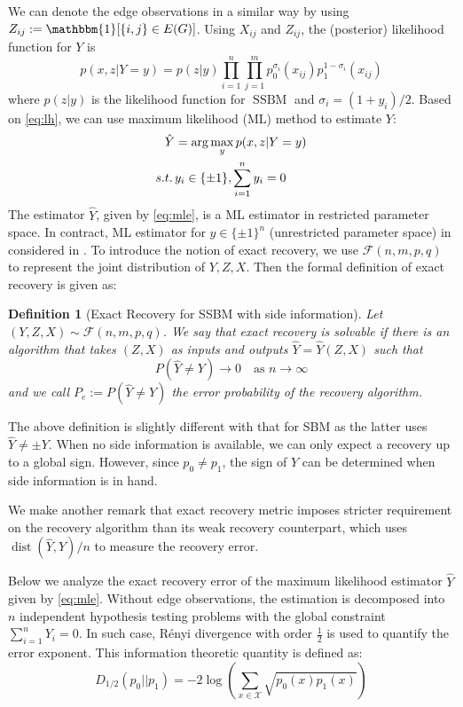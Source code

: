 \documentclass[conference]{IEEEtran}
\newtheorem{definition}{Definition}
\DeclareMathOperator{\SSBM}{SSBM}
\DeclareMathOperator{\dist}{dist}
\begin{document}
We can denote the edge observations in a similar way by using $Z_{ij}:=\mathbbm{1}[\{i,j\} \in E(G)]$.
Using $X_{ij}$ and $Z_{ij}$, the (posterior) likelihood function for $Y$ is
\begin{equation}\label{eq:lh}
    p(x, z| Y=y) = p(z|y)\prod_{i=1}^n \prod_{j=1}^m p^{\sigma_i}_0(x_{ij})p^{1-\sigma_i}_1(x_{ij}) 
\end{equation}
where $p(z|y)$ is the likelihood function for $\SSBM$ and $\sigma_i = (1+y_i)/2$.
Based on \eqref{eq:lh}, we can use maximum likelihood (ML) method to estimate
$Y$:
\begin{align}
    \hat{Y} &= \arg\max_y p(x,z|Y=y) \notag \\
    s.t.\, & y_i \in \{\pm 1\}, \sum_{i=1}^n y_i=0 \label{eq:mle}
\end{align}
The estimator $\hat{Y}$, given by \eqref{eq:mle}, is a ML estimator in restricted parameter space.
In contract, ML estimator for $y\in \{ \pm 1 \}^n$ (unrestricted parameter space) in considered in \cite{abbe17sideinfo}.
To introduce the notion of exact recovery, we use $\mathcal{F}(n,m,p,q)$ to represent the joint distribution
of $Y,Z, X$.
Then the formal definition of exact
recovery is given as:
\begin{definition}[Exact Recovery for SSBM with side information]
		Let $(Y,Z,X) \sim \mathcal{F}(n,m,p,q)$.
		We say that exact recovery is solvable if there is an algorithm that takes $(Z,X)$ as inputs and outputs $\hat{Y}=\hat{Y}(Z,X)$ such that
		$$
		P(\hat{Y} \neq Y) \to 0
		\text{~~~as~} n\to\infty
		$$
		and we call $P_e:=P(\hat{Y} \neq Y)$ the error probability of the recovery algorithm.
\end{definition}
The above definition is slightly different with that for SBM as the latter uses $\hat{Y} \neq \pm Y$.
When no side information is available, we can only expect a recovery up to a global sign. However,
since $p_0 \neq p_1$, the sign of $Y$ can be determined when side information is in hand.

We make another remark that exact recovery metric imposes stricter requirement on the recovery algorithm than its weak recovery
counterpart, which uses $\dist(\hat{Y}, Y)/n$ to measure the recovery error.

Below we analyze the exact recovery error of the maximum likelihood estimator $\hat{Y}$
given by \eqref{eq:mle}.
Without edge observations, the estimation is decomposed into $n$
independent hypothesis testing problems with the global constraint $\sum_{i=1}^n Y_i=0$. 
In such case, Rényi divergence with order $\frac{1}{2}$
is used to quantify the error exponent.
This information theoretic quantity is defined as:
\begin{equation}
D_{1/2}(p_0 || p_1) = -2\log(\sum_{x \in \mathcal{X}} \sqrt{p_0(x)p_1(x)} )
\end{equation}
\end{document}
